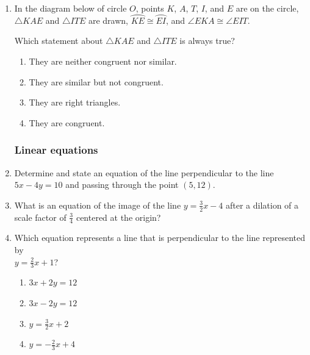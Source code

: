 \documentclass[12pt, oneside]{article}
\begin{document}
\begin{enumerate}[itemsep=0cm]
\item In the diagram below of circle $O$, points $K$, $A$, $T$, $I$, and $E$ are on the circle, $\triangle KAE$ and $\triangle ITE$ are drawn, $\wideparen{KE} \cong \wideparen{EI}$, and $\angle EKA \cong \angle EIT$.
\begin{center}
  \end{center}
  Which statement about $\triangle KAE$ and $\triangle ITE$ is always true?
  \begin{enumerate}
    \item They are neither congruent nor similar.
    \item They are similar but not congruent.
    \item They are right triangles.
    \item They are congruent.
  \end{enumerate}

\newpage
\subsubsection*{Linear equations}
\item Determine and state an equation of the line perpendicular to the line\\ $5x-4y=10$ and passing through the point $(5,12)$.

\item What is an equation of the image of the line $\displaystyle y=\frac{3}{2}x-4$ after a dilation of a scale factor of $\displaystyle \frac{3}{4}$ centered at the origin?

\item Which equation represents a line that is perpendicular to the line represented by\\[0.25cm] $\displaystyle y=\frac{2}{3}x+1$?
  \begin{multicols}{2}
    \begin{enumerate}
      \item $3x+2y=12$
      \item $3x-2y=12$ 
      \item $\displaystyle y=\frac{3}{2}x+2$
      \item $\displaystyle y=-\frac{2}{3}x+4$
    \end{enumerate}
  \end{multicols}


\end{enumerate}
\end{document}
